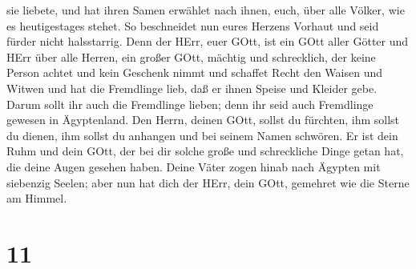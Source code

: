 sie liebete, und hat ihren Samen erwählet nach ihnen, euch, über alle
Völker, wie es heutigestages stehet.  So beschneidet nun
eures Herzens Vorhaut und seid fürder nicht halsstarrig. 
Denn der HErr, euer GOtt, ist ein GOtt aller Götter und HErr über alle
Herren, ein großer GOtt, mächtig und schrecklich, der keine Person
achtet und kein Geschenk nimmt  und schaffet Recht den
Waisen und Witwen und hat die Fremdlinge lieb, daß er ihnen Speise und
Kleider gebe.  Darum sollt ihr auch die Fremdlinge lieben;
denn ihr seid auch Fremdlinge gewesen in Ägyptenland.  Den
Herrn, deinen GOtt, sollst du fürchten, ihm sollst du dienen, ihm sollst
du anhangen und bei seinem Namen schwören.  Er ist dein
Ruhm und dein GOtt, der bei dir solche große und schreckliche Dinge
getan hat, die deine Augen gesehen haben.  Deine Väter
zogen hinab nach Ägypten mit siebenzig Seelen; aber nun hat dich der
HErr, dein GOtt, gemehret wie die Sterne am Himmel.

\hypertarget{section-10}{%
\section{11}\label{section-10}}


